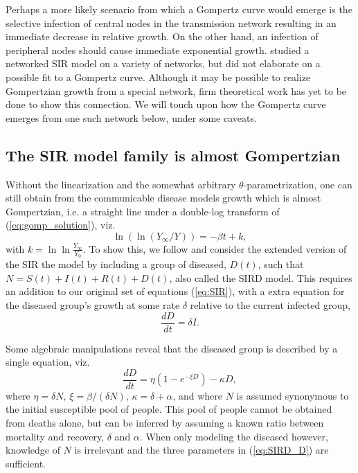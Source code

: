 \documentclass{article}
\begin{document}
 Perhaps a more likely scenario from which a Gompertz curve would emerge is the selective infection of central nodes in the transmission network resulting in an immediate decrease in relative growth. 
 On the other hand, an infection of peripheral nodes should cause immediate exponential growth. 
 \citet{herrmann2020covid} studied a networked SIR model on a variety of networks, but did not elaborate on a possible fit to a Gompertz curve. 
 Although it may be possible to realize Gompertzian growth from a special network, firm theoretical work has yet to be done to show this connection. 
 We will touch upon how the Gompertz curve emerges from one such network below, under some caveats.

\subsection{The SIR model family is almost Gompertzian}
Without the linearization and the somewhat arbitrary $\theta$-parametrization, one can still obtain from the communicable disease models growth which is almost Gompertzian, i.e. a straight line under a double-log transform of (\ref{eq:gomp_solution}), viz.
\begin{equation}
\label{eq:GOMP_D}
\ln{(\ln{(Y_{\infty}/Y)})} = -\beta t + k,
\end{equation}
with $k=\ln{\ln{\frac{Y_{\infty}}{Y_{0}}}}$. To show this, we follow \citet{carletti2020covid} and consider the extended version of the SIR the model by including a group of diseased, $D(t)$, such that $N = S(t) + I(t) + R(t) + D(t)$, also called the SIRD model. This requires an addition to our original set of equations (\ref{eq:SIR}), with a extra equation for the diseased group's growth at some rate $\delta$ relative to the current infected group,
\begin{equation}
\frac{dD}{dt} = \delta I.
\end{equation}

Some algebraic manipulations reveal that the diseased group is described by a single equation, viz.
\begin{equation}
\label{eq:SIRD_D}
\frac{dD}{dt} = \eta( 1 - e^{-\xi D}) - \kappa D,
\end{equation}
where $\eta = \delta N$, $\xi = \beta/(\delta N)$, $\kappa = \delta + \alpha$, and where $N$ is assumed synonymous to the initial susceptible pool of people. This pool of people cannot be obtained from deaths alone, but can be inferred by assuming a known ratio between mortality and recovery, $\delta$ and $\alpha$. 
When only modeling the diseased however, knowledge of $N$ is irrelevant and the three parameters in (\ref{eq:SIRD_D}) are sufficient.
\end{document}
